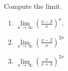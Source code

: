 Compute the limit. 
\begin{enumerate}[ref={\fcProblemRef}]
\item \label{problemlimxtoinfty((x-2)/x)^x} $\displaystyle\lim\limits_{x\to\infty}\left(\frac{x-2}{x}\right)^x.$
\item $\displaystyle\lim\limits_{x\to\infty} \left(\frac{x-2 }{x} \right)^{2 x}$ 

\item $\displaystyle \lim\limits_{x\to\infty} \left(\frac{x}{ x + 3} \right)^{2x}$ 

\end{enumerate}